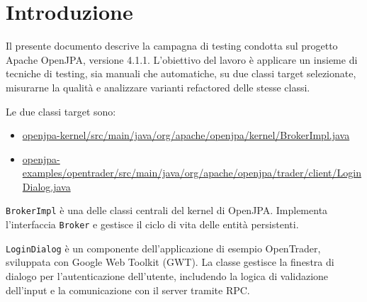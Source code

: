 \section{Introduzione}

Il presente documento descrive la campagna di testing condotta sul progetto
Apache OpenJPA, versione 4.1.1.
L'obiettivo del lavoro è applicare un insieme di tecniche di testing,
sia manuali che automatiche, su due classi target selezionate,
misurarne la qualità e analizzare varianti refactored delle stesse classi.

Le due classi target sono:
\begin{itemize}[leftmargin=1.5em]
    \raggedright
    \item \url{openjpa-kernel/src/main/java/org/apache/openjpa/kernel/BrokerImpl.java}
    \item \url{openjpa-examples/opentrader/src/main/java/org/apache/openjpa/trader/client/LoginDialog.java}
\end{itemize}

\texttt{BrokerImpl} è una delle classi centrali del kernel di OpenJPA.
Implementa l'interfaccia \texttt{Broker} e gestisce il ciclo di vita
delle entità persistenti.

\texttt{LoginDialog} è un componente dell'applicazione di esempio
OpenTrader, sviluppata con Google Web Toolkit (GWT).
La classe gestisce la finestra di dialogo per l'autenticazione
dell'utente, includendo la logica di validazione dell'input e la
comunicazione con il server tramite RPC.
